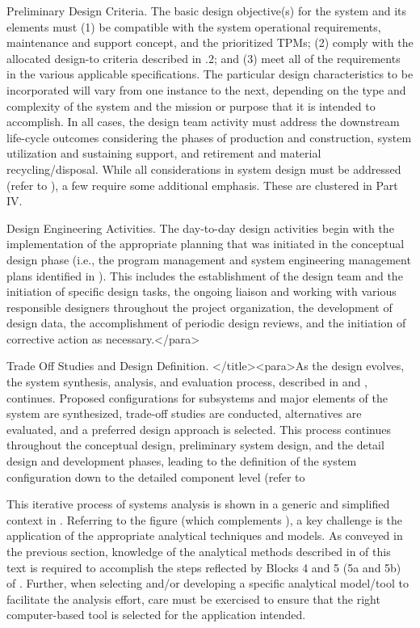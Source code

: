 Preliminary Design Criteria. The basic design objective(s) for the system and its elements must (1) be compatible with the system operational requirements, maintenance and support concept, and the prioritized TPMs; (2) comply with the allocated design-to criteria described in .2; and (3) meet all of the requirements in the various applicable specifications. The particular design characteristics to be incorporated will vary from one instance to the next, depending on the type and complexity of the system and the mission or purpose that it is intended to accomplish. In all cases, the design team activity must address the downstream life-cycle outcomes considering the phases of production and construction, system utilization and sustaining support, and retirement and material recycling/disposal. While all considerations in system design must be addressed (refer to ), a few require some additional emphasis. These are clustered in Part IV.

Design Engineering Activities. The day-to-day design activities begin with the implementation of the appropriate planning that was initiated in the conceptual design phase (i.e., the program management and system engineering management plans identified in ). This includes the establishment of the design team and the initiation of specific design tasks, the ongoing liaison and working with various responsible designers throughout the project organization, the development of design data, the accomplishment of periodic design reviews, and the initiation of corrective action as necessary.</para>

Trade Off Studies and Design Definition. </title><para>As the design evolves, the system synthesis, analysis, and evaluation process, described in and , continues. Proposed configurations for subsystems and major elements of the system are synthesized, trade-off studies are conducted, alternatives are evaluated, and a preferred design approach is selected. This process continues throughout the conceptual design, preliminary system design, and the detail design and development phases, leading to the definition of the system configuration down to the detailed component level (refer to 

This iterative process of systems analysis is shown in a generic and simplified context in . Referring to the figure (which complements ), a key challenge is the application of the appropriate analytical techniques and models. As conveyed in the previous section, knowledge of the analytical methods described in  of this text is required to accomplish the steps reflected by Blocks 4 and 5 (5a and 5b) of . Further, when selecting and/or developing a specific analytical model/tool to facilitate the analysis effort, care must be exercised to ensure that the right computer-based tool is selected for the application intended.

